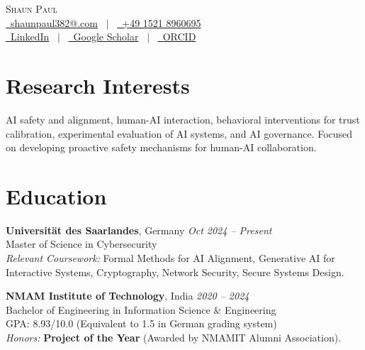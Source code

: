 \documentclass[a4paper,11pt]{article}
\begin{document}
\pagestyle{empty} 

\begin{center}
    {\Huge \scshape Shaun Paul} \\[5pt]
    \href{mailto:shaunpaul382@.com}{\faEnvelope \ shaunpaul382@.com} \ $|$ \ 
    \href{tel:+4915218960695}{\faMobile \ +49 1521 8960695} \\
    \href{https://www.linkedin.com/in/shaun-paul-a15a32251}{\faLinkedin \ LinkedIn} \ $|$ \ 
    \href{https://scholar.google.com/citations?user=43CupecAAAAJ&hl=en}{\faGraduationCap \ Google Scholar} \ $|$ \ 
    \href{https://orcid.org/0009-0002-6161-8018}{\faOrcid \ ORCID}
\end{center}

\section{Research Interests}
AI safety and alignment, human-AI interaction, behavioral interventions for trust calibration, experimental evaluation of AI systems, and AI governance. Focused on developing proactive safety mechanisms for human-AI collaboration.

\section{Education}
\textbf{Universität des Saarlandes}, Germany \hfill \textit{Oct 2024 -- Present} \\
Master of Science in Cybersecurity \\
\textit{Relevant Coursework:} Formal Methods for AI Alignment, Generative AI for Interactive Systems, Cryptography, Network Security, Secure Systems Design.

\textbf{NMAM Institute of Technology}, India \hfill \textit{2020 -- 2024} \\
Bachelor of Engineering in Information Science \& Engineering \\
GPA: 8.93/10.0 (Equivalent to 1.5 in German grading system) \\
\textit{Honors:} \textbf{Project of the Year} (Awarded by NMAMIT Alumni Association).
\end{document}
